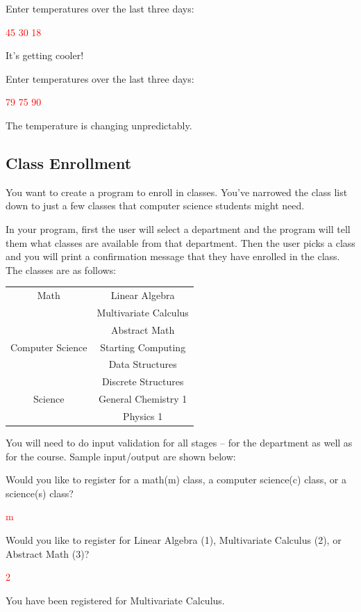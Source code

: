 \begin{sample}
Enter temperatures over the last three days:

\textcolor{red}{45 30 18}

It's getting cooler!
\end{sample}

\begin{sample}
Enter temperatures over the last three days:

\textcolor{red}{79 75 90}

The temperature is changing unpredictably.
\end{sample}

\subsection{Class Enrollment}
You want to create a program to enroll in classes. You've narrowed the class list down to just a few classes that computer science students might need.

In your program, first the user will select a department and the program will tell them what classes are available from that department. Then the user picks a class and you will print a confirmation message that they have enrolled in the class. The classes are as follows:

\begin{table}[H]
    \centering
    \begin{tabular}{c|c}
        Math &  Linear Algebra\\
        & Multivariate Calculus\\
        & Abstract Math \\ \hline
        Computer Science & Starting Computing \\
        & Data Structures \\
        & Discrete Structures \\ \hline
        Science & General Chemistry 1 \\
         & Physics 1
    \end{tabular}
\end{table}

You will need to do input validation for all stages -- for the department as well as for the course. Sample input/output are shown below:

\begin{sample}
    Would you like to register for a math(m) class, a computer science(c) class, or a science(s) class?

    \textcolor{red}{m}

    Would you like to register for Linear Algebra (1), Multivariate Calculus (2), or Abstract Math (3)?

    \textcolor{red}{2}

    You have been registered for Multivariate Calculus. 
\end{sample}

